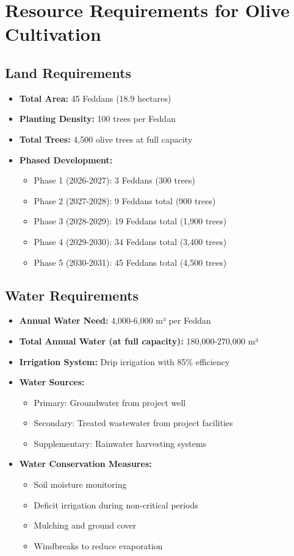 \section{Resource Requirements for Olive Cultivation}

\subsection{Land Requirements}
\begin{itemize}
    \item \textbf{Total Area:} 45 Feddans (18.9 hectares)
    \item \textbf{Planting Density:} 100 trees per Feddan
    \item \textbf{Total Trees:} 4,500 olive trees at full capacity
    \item \textbf{Phased Development:}
    \begin{itemize}
        \item Phase 1 (2026-2027): 3 Feddans (300 trees)
        \item Phase 2 (2027-2028): 9 Feddans total (900 trees)
        \item Phase 3 (2028-2029): 19 Feddans total (1,900 trees)
        \item Phase 4 (2029-2030): 34 Feddans total (3,400 trees)
        \item Phase 5 (2030-2031): 45 Feddans total (4,500 trees)
    \end{itemize}
\end{itemize}

\subsection{Water Requirements}
\begin{itemize}
    \item \textbf{Annual Water Need:} 4,000-6,000 m³ per Feddan
    \item \textbf{Total Annual Water (at full capacity):} 180,000-270,000 m³
    \item \textbf{Irrigation System:} Drip irrigation with 85\% efficiency
    \item \textbf{Water Sources:}
    \begin{itemize}
        \item Primary: Groundwater from project well
        \item Secondary: Treated wastewater from project facilities
        \item Supplementary: Rainwater harvesting systems
    \end{itemize}
    \item \textbf{Water Conservation Measures:}
    \begin{itemize}
        \item Soil moisture monitoring
        \item Deficit irrigation during non-critical periods
        \item Mulching and ground cover
        \item Windbreaks to reduce evaporation
    \end{itemize}
\end{itemize}

